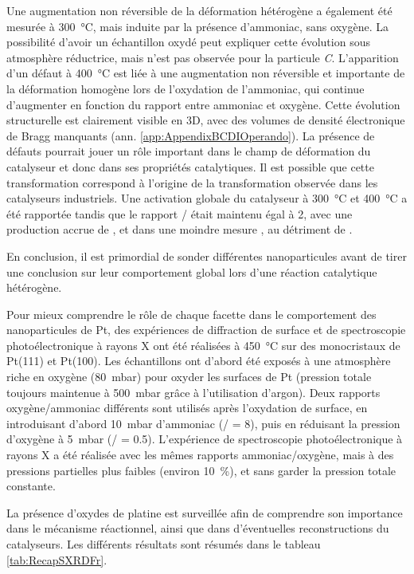 Une augmentation non réversible de la déformation hétérogène a également été mesurée à \qty{300}{\degreeCelsius}, mais induite par la présence d'ammoniac, sans oxygène.
La possibilité d'avoir un échantillon oxydé peut expliquer cette évolution sous atmosphère réductrice, mais n'est pas observée pour la particule \textit{C}.
L'apparition d'un défaut à \qty{400}{\degreeCelsius} est liée à une augmentation non réversible et importante de la déformation homogène lors de l'oxydation de l'ammoniac, qui continue d'augmenter en fonction du rapport entre ammoniac et oxygène.
Cette évolution structurelle est clairement visible en 3D, avec des volumes de densité électronique de Bragg manquants (ann. \ref{app:AppendixBCDIOperando}).
La présence de défauts pourrait jouer un rôle important dans le champ de déformation du catalyseur et donc dans ses propriétés catalytiques.
Il est possible que cette transformation correspond à l'origine de la transformation observée dans les catalyseurs industriels.
Une activation globale du catalyseur à \qty{300}{\degreeCelsius} et \qty{400}{\degreeCelsius} a été rapportée tandis que le rapport / était maintenu égal à 2, avec une production accrue de , et dans une moindre mesure , au détriment de .

En conclusion, il est primordial de sonder différentes nanoparticules avant de tirer une conclusion sur leur comportement global lors d’une réaction catalytique hétérogène.

Pour mieux comprendre le rôle de chaque facette dans le comportement des nanoparticules de Pt, des expériences de diffraction de surface et de spectroscopie photoélectronique à rayons X ont été réalisées à \qty{450}{\degreeCelsius} sur des monocristaux de Pt(111) et Pt(100).
Les échantillons ont d'abord été exposés à une atmosphère riche en oxygène (\qty{80}{\milli\bar}) pour oxyder les surfaces de Pt (pression totale toujours maintenue à \qty{500}{\milli\bar} grâce à l'utilisation d'argon).
Deux rapports oxygène/ammoniac différents sont utilisés après l'oxydation de surface, en introduisant d'abord \qty{10}{\milli\bar} d'ammoniac (/ = \num{8}), puis en réduisant la pression d'oxygène à \qty{5}{\milli\bar} (/ = \num{0.5}).
L'expérience de spectroscopie photoélectronique à rayons X a été réalisée avec les mêmes rapports ammoniac/oxygène, mais à des pressions partielles plus faibles (environ \qty{10}{\percent}), et sans garder la pression totale constante.

La présence d'oxydes de platine est surveillée afin de comprendre son importance dans le mécanisme réactionnel, ainsi que dans d'éventuelles reconstructions du catalyseurs.
Les différents résultats sont résumés dans le tableau \ref{tab:RecapSXRDFr}.

